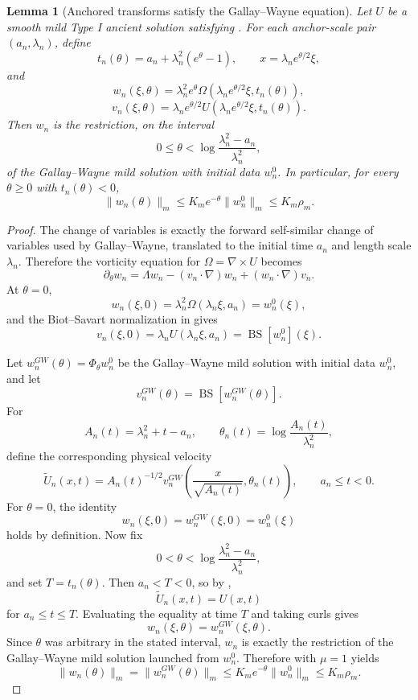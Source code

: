 \documentclass[11pt]{amsart}
\theoremstyle{plain}
\newtheorem{lemma}[lemma]{Lemma}
\theoremstyle{definition}
\theoremstyle{remark}
\numberwithin{equation}{section}
\begin{document}
\begin{lemma}[Anchored transforms satisfy the Gallay--Wayne equation]
\label{p3:lem:anchored-gw-transform}
Let \(U\) be a smooth mild Type I ancient solution satisfying
.  For each anchor-scale pair
\((a_n,\lambda_n)\), define
\[
   t_n(\theta)=a_n+\lambda_n^2(e^\theta-1),
   \qquad
   x=\lambda_n e^{\theta/2}\xi,
\]
and
\[
   w_n(\xi,\theta)
   =
   \lambda_n^2e^\theta
   \Omega(\lambda_n e^{\theta/2}\xi,t_n(\theta)),
\]
\[
   v_n(\xi,\theta)
   =
   \lambda_n e^{\theta/2}
   U(\lambda_n e^{\theta/2}\xi,t_n(\theta)).
\]
Then \(w_n\) is the restriction, on the interval
\[
   0\le \theta<\log\frac{\lambda_n^2-a_n}{\lambda_n^2},
\]
of the Gallay--Wayne mild solution with initial data \(w_n^0\).  In
particular, for every \(\theta\ge0\) with \(t_n(\theta)<0\),
\[
   \|w_n(\theta)\|_m
   \le
   K_m e^{-\theta}\|w_n^0\|_m
   \le
   K_m\rho_m .
\]
\end{lemma}

\begin{proof}
The change of variables is exactly the forward self-similar change of
variables used by Gallay--Wayne, translated to the initial time \(a_n\)
and length scale \(\lambda_n\).  Therefore the vorticity equation for
\(\Omega=\nabla\times U\) becomes
\[
   \partial_\theta w_n
   =
   \Lambda w_n-(v_n\cdot\nabla)w_n+(w_n\cdot\nabla)v_n .
\]
At \(\theta=0\),
\[
   w_n(\xi,0)=\lambda_n^2\Omega(\lambda_n\xi,a_n)=w_n^0(\xi),
\]
and the Biot--Savart normalization in
 gives
\[
   v_n(\xi,0)=\lambda_n U(\lambda_n\xi,a_n)=\operatorname{BS}[w_n^0](\xi).
\]

Let \(w_n^{GW}(\theta)=\Phi_\theta w_n^0\) be the Gallay--Wayne mild solution
with initial data \(w_n^0\), and let
\[
   v_n^{GW}(\theta)=\operatorname{BS}[w_n^{GW}(\theta)].
\]
For
\[
   A_n(t)=\lambda_n^2+t-a_n,
   \qquad
   \theta_n(t)=\log\frac{A_n(t)}{\lambda_n^2},
\]
define the corresponding physical velocity
\[
   \widetilde U_n(x,t)
   =
   A_n(t)^{-1/2}
   v_n^{GW}\!\left(
      \frac{x}{\sqrt{A_n(t)}},
      \theta_n(t)
   \right),
   \qquad a_n\le t<0.
\]
For \(\theta=0\), the identity
\[
   w_n(\xi,0)=w_n^{GW}(\xi,0)=w_n^0(\xi)
\]
holds by definition.  Now fix
\[
   0<\theta<\log\frac{\lambda_n^2-a_n}{\lambda_n^2},
\]
and set \(T=t_n(\theta)\).  Then \(a_n<T<0\), so by
,
\[
   \widetilde U_n(x,t)=U(x,t)
\]
for \(a_n\le t\le T\).  Evaluating the equality at time \(T\) and taking curls gives
\[
   w_n(\xi,\theta)=w_n^{GW}(\xi,\theta).
\]
Since \(\theta\) was arbitrary in the stated interval, \(w_n\) is exactly the
restriction of the Gallay--Wayne mild solution launched from \(w_n^0\).
Therefore  with \(\mu=1\) yields
\[
   \|w_n(\theta)\|_m
   =
   \|w_n^{GW}(\theta)\|_m
   \le
   K_m e^{-\theta}\|w_n^0\|_m
   \le
   K_m\rho_m .
\]
\end{proof}
\end{document}
